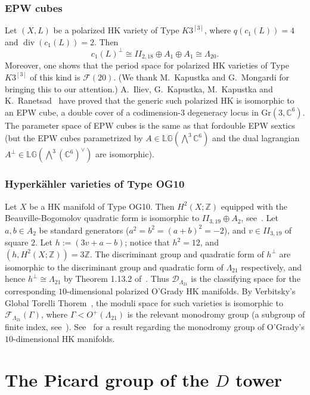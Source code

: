\documentclass[11pt]{amsart}
\numberwithin{equation}{subsection}
\theoremstyle{plain}
\theoremstyle{remark}
\theoremstyle{definition}
\newcommand{\Gr}{\mathrm{Gr}}
\newcommand{\CC}{{\mathbb C}}
\newcommand{\cD}{{\mathscr D}}
\newcommand{\cF}{{\mathscr F}}
\newcommand{\lagr}{\mathbb{LG}(\bigwedge^ 3 \CC^6)}
\newcommand{\lagrdual}{\mathbb{LG}(\bigwedge^ 3 (\CC^6)^{\vee})}
\newcommand{\ZZ}{{\mathbb Z}}
\DeclareMathOperator{\divisore}{div}
\begin{document}
\subsubsection{EPW cubes}
%
Let $(X,L)$ be a polarized   HK variety of Type $K3^{[3]}$, where $q(c_1(L))=4$ and $\divisore(c_1(L))=2$.
 Then 
%
\begin{equation*}
%
c_1(L)^{\bot}\cong  II_{2,18}\oplus  A_1\oplus  A_1\cong  \Lambda_{20}.
%
\end{equation*}
%
Moreover, one shows that the period space for polarized   HK varieties of Type $K3^{[3]}$ of this kind is   
$\cF(20)$. (We thank M.~Kapustka and G.~Mongardi for bringing this to our attention.)  A.~Iliev, G.~Kapustka, M.~Kapustka and K.~Ranetsad~\cite{ikkr} have proved that the generic such polarized HK is isomorphic to an EPW cube, a double cover of a codimension-$3$ degeneracy locus in $\Gr(3,\CC^6)$. The parameter space of EPW cubes is the same as that fordouble EPW sextics (but the EPW cubes parametrized by $A\in\lagr$ and the dual lagrangian $A^{\bot}\in\lagrdual$ are isomorphic). 
%
\subsubsection{Hyperk\"ahler varieties of Type OG10}
%
Let $X$ be  a   HK manifold of Type OG10. Then $H^2(X;\ZZ)$ equipped with the Beauville-Bogomolov quadratic form is isomorphic to $II_{3,19}\oplus A_2$, see~\cite{rapagnetta}. Let $a,b\in A_2$ be standard generators ($a^2=b^2=(a+b)^2=-2$), and $v\in II_{3,19}$ of square $2$.  Let 
$h:=(3v+a-b)$; notice that $h^2=12$, and $(h,H^2(X;\ZZ))=3\ZZ$. 
The  discriminant group and quadratic form of  $h^{\bot}$ 
are isomorphic to the discriminant group and quadratic form of $\Lambda_{21}$ respectively, and hence $h^{\bot}\cong \Lambda_{21}$ by Theorem 1.13.2 of~\cite{nikulin}. Thus $\cD_{\Lambda_{21}}$ is the classifying space for the corresponding 
$10$-dimensional polarized O'Grady HK manifolds. By Verbitsky's Global Torelli Thorem~\cite{verbitskytor}, the moduli space  for such  varieties is isomorphic to $\cF_{\Lambda_{21}}(\Gamma)$, where $\Gamma<O^{+}(\Lambda_{21})$ is the relevant monodromy group (a subgroup of finite index, see~\cite{verbitskytor}).
See~\cite{mongardimon} for a result regarding the  monodromy group of O'Grady's  $10$-dimensional   HK manifolds.


\section{The Picard group of the $D$ tower}\label{sec:picdtower}
\end{document}

